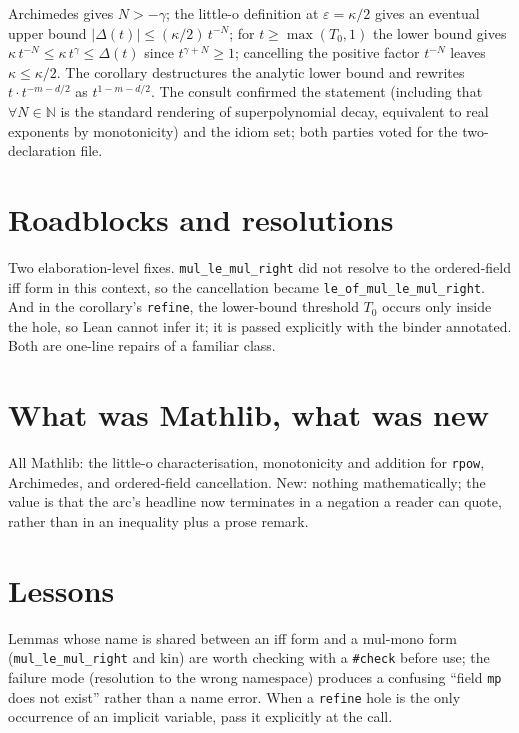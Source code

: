 \documentclass[11pt]{article}
\begin{document}
Archimedes gives $N > -\gamma$; the little-o definition at
$\varepsilon = \kappa/2$ gives an eventual upper bound
$|\Delta(t)| \leq (\kappa/2)\, t^{-N}$; for $t \geq \max(T_0, 1)$ the
lower bound gives $\kappa\, t^{-N} \leq \kappa\, t^\gamma \leq \Delta(t)$
since $t^{\gamma + N} \geq 1$; cancelling the positive factor $t^{-N}$
leaves $\kappa \leq \kappa/2$. The corollary destructures the analytic
lower bound and rewrites $t \cdot t^{-m-d/2}$ as $t^{1-m-d/2}$. The
consult confirmed the statement (including that $\forall N \in \mathbb{N}$
is the standard rendering of superpolynomial decay, equivalent to real
exponents by monotonicity) and the idiom set; both parties voted for the
two-declaration file.

\section{Roadblocks and resolutions}

Two elaboration-level fixes. \texttt{mul\_le\_mul\_right} did not resolve
to the ordered-field iff form in this context, so the cancellation became
\texttt{le\_of\_mul\_le\_mul\_right}. And in the corollary's
\texttt{refine}, the lower-bound threshold $T_0$ occurs only inside the
hole, so Lean cannot infer it; it is passed explicitly with the binder
annotated. Both are one-line repairs of a familiar class.

\section{What was Mathlib, what was new}

All Mathlib: the little-o characterisation, monotonicity and addition
for \texttt{rpow}, Archimedes, and ordered-field cancellation. New: nothing
mathematically; the value is that the arc's headline now terminates in a
negation a reader can quote, rather than in an inequality plus a prose
remark.

\section{Lessons}

Lemmas whose name is shared between an iff form and a mul-mono form
(\texttt{mul\_le\_mul\_right} and kin) are worth checking with a
\texttt{\#check} before use; the failure mode (resolution to the wrong
namespace) produces a confusing ``field \texttt{mp} does not exist''
rather than a name error. When a \texttt{refine} hole is the only
occurrence of an implicit variable, pass it explicitly at the call.
\end{document}
